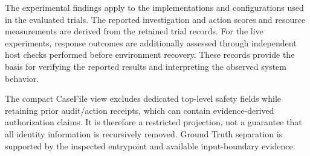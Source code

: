 \documentclass[pdflatex,sn-basic]{sn-jnl}
\begin{document}
The experimental findings apply to the implementations and configurations used in the evaluated trials. The reported investigation and action scores and resource measurements are derived from the retained trial records. For the live experiments, response outcomes are additionally assessed through independent host checks performed before environment recovery. These records provide the basis for verifying the reported results and interpreting the observed system behavior.

The compact CaseFile view excludes dedicated top-level safety fields while retaining prior audit/action receipts, which can contain evidence-derived authorization claims. It is therefore a restricted projection, not a guarantee that all identity information is recursively removed. Ground Truth separation is supported by the inspected entrypoint and available input-boundary evidence.




\clearpage

\end{document}
